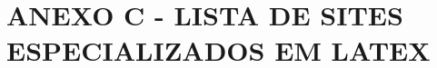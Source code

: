 \renewcommand{\thechapter}{}%
\chapter{ANEXO C - LISTA DE SITES ESPECIALIZADOS EM LATEX} %
\label{anexoC} %
\renewcommand{\thechapter}{C}%